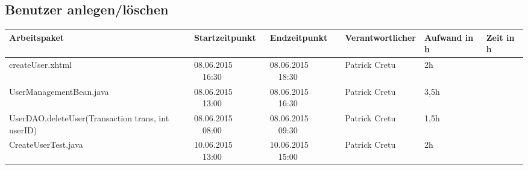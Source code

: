 \begin{landscape}
	\subsection{Benutzer anlegen/löschen}
	\begin{tabular}{|p{10.3cm}|p{3.2cm}|p{3.2cm}|p{3.5cm}|p{1.7cm}|p{1.5cm}|}
		\hline  \textbf{Arbeitspaket} & \textbf{Startzeitpunkt} & \textbf{Endzeitpunkt} & \textbf{Verantwortlicher}  & \textbf{Aufwand in h} & \textbf{Zeit in h}\\ 
		\hline   createUser.xhtml                                      & 08.06.2015 \ \ 16:30        & 08.06.2015 \ \ 18:30        &  Patrick Cretu &  2h                 &\\ 
		\hline   UserManagementBean.java                               & 08.06.2015 \ \ 13:00        & 08.06.2015 \ \ 16:30        &  Patrick Cretu	&  3,5h               & \\ 
		\hline   UserDAO.deleteUser(Transaction trans, int userID)     & 08.06.2015 \ \ 08:00        & 08.06.2015 \ \ 09:30        &  Patrick Cretu &  1,5h               &\\ 
		\hline   CreateUserTest.java                                   & 10.06.2015 \ \ 13:00        & 10.06.2015 \ \ 15:00        &  Patrick Cretu &   2h                &\\
		\hline 
	\end{tabular} \ \\
	\ \\
	

\end{landscape}
